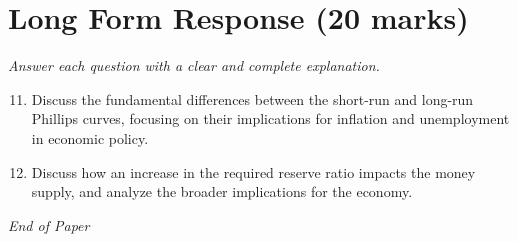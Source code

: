 \documentclass[12pt]{article}
\begin{document}
\section*{Long Form Response (20 marks)}
\textit{Answer each question with a clear and complete explanation.}
\begin{enumerate}[label=\arabic*.]
\setcounter{enumi}{10}
\item Discuss the fundamental differences between the short-run and long-run Phillips curves, focusing on their implications for inflation and unemployment in economic policy.
\item Discuss how an increase in the required reserve ratio impacts the money supply, and analyze the broader implications for the economy.
\end{enumerate}

\vfill
\noindent\textit{End of Paper}
\end{document}
